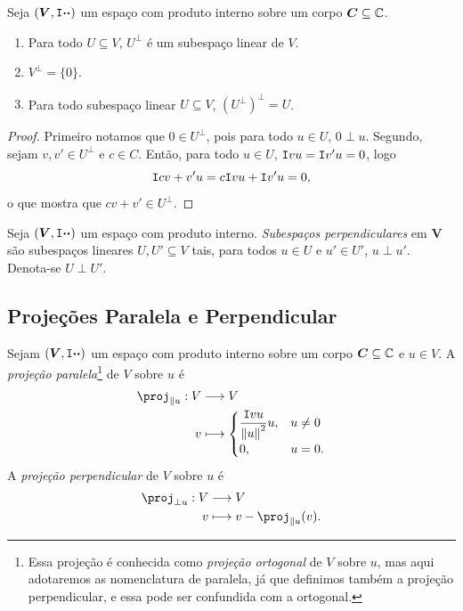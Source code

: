 \begin{prop}
Seja $(\bm V,\mathtt I{\bm{\cdot}}{\bm{\cdot}})$ um espaço com produto interno sobre um corpo $\bm C \subseteq \mathbb{C}$.
	\begin{enumerate}
	\item Para todo $U \subseteq V$, $U^\perp$ é um subespaço linear de $V$.
	\item $V^\perp = \{0\}$.
	\item Para todo subespaço linear $U \subseteq V$, $(U^\perp)^\perp = U$.
	\end{enumerate}
\end{prop}
\begin{proof}
Primeiro notamos que $0 \in U^\perp$, pois para todo $u \in U$, $0 \perp u$. Segundo, sejam $v,v' \in U^\perp$ e $c \in C$. Então, para todo $u \in U$, $\mathtt I{v}{u} = \mathtt I{v'}{u} = 0$, logo
	\begin{equation*}
	\mathtt I{cv+v'}{u} = c\mathtt I{v}{u} + \mathtt I{v'}{u} = 0,
	\end{equation*}
o que mostra que $cv+v' \in U^\perp$.
\end{proof}

\begin{defi}
Seja $(\bm V,\mathtt I{\bm{\cdot}}{\bm{\cdot}})$ um espaço com produto interno. \emph{Subespaços perpendiculares} em $\bm V$ são subespaços lineares $U,U' \subseteq V$ tais, para todos $u \in U$ e $u' \in U'$, $u \perp u'$. Denota-se $U \perp U'$.
\end{defi}

\subsection{Projeções Paralela e Perpendicular}

\begin{defi}
Sejam $(\bm V,\mathtt I{\bm{\cdot}}{\bm{\cdot}})$ um espaço com produto interno sobre um corpo $\bm C \subseteq \mathbb{C}$ e $u \in V$. A \emph{projeção paralela}\footnote{Essa projeção é conhecida como \emph{projeção ortogonal} de $V$ sobre $u$, mas aqui adotaremos as nomenclatura de paralela, já que definimos também a projeção perpendicular, e essa pode ser confundida com a ortogonal.} de $V$ sobre $u$ é
	\begin{align*}
	\func{\proj_{\parallel u}}{V}{V}{v}{
		\begin{cases}
			\displaystyle\frac{\inte{v}{u}}{\nor{u}^2}u,& u \neq 0 \\
			0,& u=0.
		\end{cases}
	}
	\end{align*}
A \emph{projeção perpendicular} de $V$ sobre $u$ é
	\begin{align*}
	\func{\proj_{\perp u}}{V}{V}{v}{v - \proj_{\parallel u}(v).}
	\end{align*}
\end{defi}

